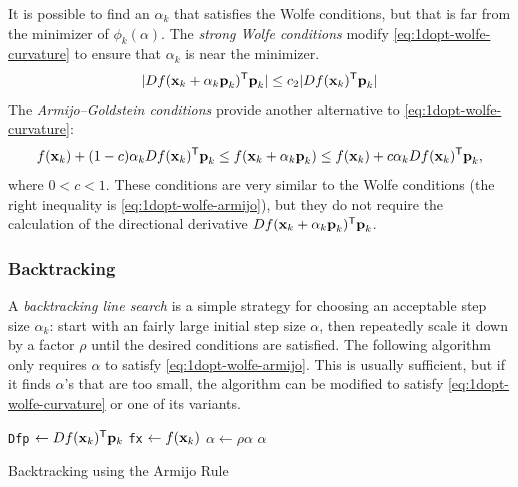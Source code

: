 It is possible to find an $\alpha_k$ that satisfies the Wolfe conditions, but that is far from the minimizer of $\phi_k(\alpha)$.
The \emph{strong Wolfe conditions} modify \eqref{eq:1dopt-wolfe-curvature} to ensure that $\alpha_k$ is near the minimizer.
\begin{equation*}
    | Df(\textbf{x}_k + \alpha_k \textbf{p}_k)^{\mathsf T} \textbf{p}_k| \leq c_2| Df(\textbf{x}_k)^{\mathsf T} \textbf{p}_k|
\end{equation*}
The \emph{Armijo--Goldstein conditions} provide another alternative to \eqref{eq:1dopt-wolfe-curvature}:
\begin{equation*}
    f(\textbf{x}_k) + (1 - c)\alpha_k Df(\textbf{x}_k)^{\mathsf T} \textbf{p}_k \leq f(\textbf{x}_k + \alpha_k\textbf{p}_k) \leq f(\textbf{x}_k) + c\alpha_k Df(\textbf{x}_k)^{\mathsf T}\textbf{p}_k,
\end{equation*}
where $0 < c < 1$.
These conditions are very similar to the Wolfe conditions (the right inequality is \eqref{eq:1dopt-wolfe-armijo}), but they do not require the calculation of the directional derivative $ Df(\textbf{x}_k + \alpha_k \textbf{p}_k)^{\mathsf T}\textbf{p}_k$.

\subsubsection*{Backtracking}

A \emph{backtracking line search} is a simple strategy for choosing an acceptable step size $\alpha_k$: start with an fairly large initial step size $\alpha$, then repeatedly scale it down by a factor $\rho$ until the desired conditions are satisfied.
The following algorithm only requires $\alpha$ to satisfy \eqref{eq:1dopt-wolfe-armijo}.
This is usually sufficient, but if it finds $\alpha$'s that are too small, the algorithm can be modified to satisfy \eqref{eq:1dopt-wolfe-curvature} or one of its variants.

\begin{algorithm}[H]
\begin{algorithmic}[1]
    \State \texttt{Dfp} $\gets Df(\mathbf{x}_k)^{\mathsf T}\mathbf{p}_k$
    \State \texttt{fx} $\gets f(\mathbf{x}_k)$
        \State $\alpha \gets \rho\alpha$
    \EndWhile
    \Return $\alpha$
\EndProcedure
\end{algorithmic}
\caption{Backtracking using the Armijo Rule}
\label{Alg:opt1d-backtracking}
\end{algorithm}


